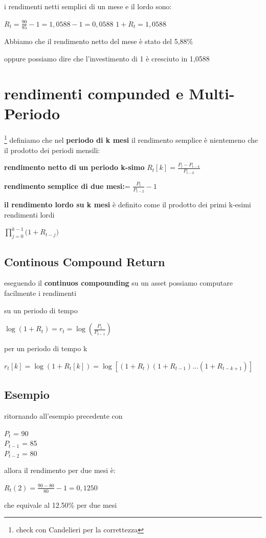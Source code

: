 \documentclass[a4paper,11pt]{report}
\begin{document}
{	i rendimenti netti semplici di un mese e il lordo sono:
\begin{center}
	$R_t={\frac{90}{85}}-1 = 1,0588-1= 0,0588$ \newline
	$1+R_t = 1,0588$
\end{center}
	Abbiamo che il rendimento netto del mese è stato del 5,88\%

	oppure possiamo dire che l'investimento di 1 è cresciuto in 1,0588
\section{rendimenti compunded e Multi-Periodo} \footnote{check con Candelieri per la correttezza}
	definiamo che nel \textbf{periodo di k mesi} il rendimento semplice è nientemeno che il prodotto dei periodi mensili:

	\textbf{rendimento netto di un periodo k-simo}	$R_t[k]= {\frac{P_t-P_{t-k}}{P_{t-k}}} $

	\textbf{rendimento semplice di due mesi:}= ${\frac {P_t}{P_{t-2}}} - 1 $

	\textbf{il rendimento lordo su k mesi } è definito come il prodotto dei primi k-esimi rendimenti lordi
\begin{center}
	${\prod\limits_{j=0}^{k-1}({1+R_{t-j}}})$
\end{center}
\subsection{Continous Compound Return}
	eseguendo  il \textbf{continuos compounding} su un asset possiamo computare facilmente i rendimenti

	su un periodo di tempo
\begin{center}
	$\log{(1+R_t)} = r_t =\log{({\frac {P_t}{P_{t-1}}})}$
\end{center}
	per un periodo di tempo k
\begin{center}
	$r_t[k]= \log{(1+R_t[k])} =\log{[(1+R_t)(1+R_{t-1})  ...(1+R_{t-k+1})]}$
\end{center}
\subsection{Esempio}
	ritornando all'esempio precedente con
	\begin{center}
	$P_t$ = 90  \\
	$P_{t-1}$ = 85 \\
	$P_{t-2}$ = 80 \\
	\end{center}
	allora il rendimento per due mesi è:
	\begin{center}
	$R_t(2) = {\frac {90-80}{80}} - 1 = 0,1250 $
	\end{center}
	che equivale al 12.50\% per due mesi

}
\end{document}
